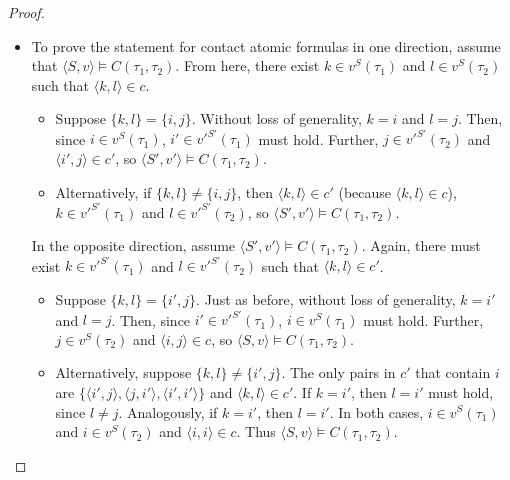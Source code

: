 \documentclass{article}
\newcommand{\lcont}{C}
\begin{document}
\begin{proof}
\begin{itemize}
\begin{itemize}
    \end{itemize}
  \item To prove the statement for contact atomic formulas in one direction, assume that $\langle S, v \rangle \models \lcont(\tau_1, \tau_2)$. From here, there exist $k \in v^S(\tau_1)$ and $l \in v^S(\tau_2)$ such that $\langle k, l \rangle \in c$.
    \begin{itemize}
    \item Suppose $\{k, l\} = \{i, j\}$. Without loss of generality, $k = i$ and $l = j$. Then, since $i \in v^S(\tau_1)$, $i' \in v'^{S'}(\tau_1)$ must hold. Further, $j \in v'^{S'}(\tau_2)$ and $\langle i', j \rangle \in c'$, so $\langle S', v' \rangle \models \lcont(\tau_1, \tau_2)$.
    \item Alternatively, if $\{k, l\} \neq \{i, j\}$, then $\langle k, l \rangle \in c'$ (because $\langle k, l \rangle \in c$), $k \in v'^{S'}(\tau_1)$ and $l \in v'^{S'}(\tau_2)$, so $\langle S', v' \rangle \models \lcont(\tau_1, \tau_2)$.
    \end{itemize}
    In the opposite direction, assume $\langle S', v' \rangle \models \lcont(\tau_1, \tau_2)$. Again, there must exist $k \in v'^{S'}(\tau_1)$ and $l \in v'^{S'}(\tau_2)$ such that $\langle k, l \rangle \in c'$.
    \begin{itemize}
    \item Suppose $\{k, l\} = \{i', j\}$. Just as before, without loss of generality, $k = i'$ and $l = j$. Then, since $i' \in v'^{S'}(\tau_1)$, $i \in v^S(\tau_1)$ must hold. Further, $j \in v^S(\tau_2)$ and $\langle i, j \rangle \in c$, so $\langle S, v \rangle \models \lcont(\tau_1, \tau_2)$.
    \item
      Alternatively, suppose $\{k, l\} \neq \{i', j\}$. The only pairs in $c'$ that contain $i$ are $\{\langle i', j \rangle, \langle j, i' \rangle, \langle i', i' \rangle\}$ and $\langle k, l \rangle \in c'$. If $k = i'$, then $l = i'$ must hold, since $l \neq j$. Analogously, if $k = i'$, then $l = i'$. In both cases, $i \in v^S(\tau_1)$ and $i \in v^S(\tau_2)$ and $\langle i, i \rangle \in c$. Thus $\langle S, v \rangle \models \lcont(\tau_1, \tau_2)$.


\end{itemize}
\end{itemize}
\end{proof}
\end{document}
